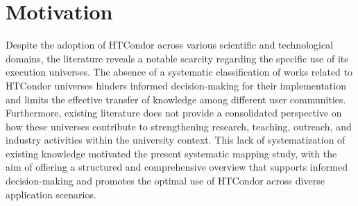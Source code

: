 \label{sec:motivacion}
\section{Motivation}
Despite the adoption of HTCondor across various scientific and technological domains, the literature reveals a notable scarcity regarding the specific use of its execution universes.
The absence of a systematic classification of works related to HTCondor universes hinders informed decision-making for their implementation and limits the effective transfer of knowledge among different user communities. Furthermore, existing literature does not provide a consolidated perspective on how these universes contribute to strengthening research, teaching, outreach, and industry activities within the university context.
This lack of systematization of existing knowledge motivated the present systematic mapping study, with the aim of offering a structured and comprehensive overview that supports informed decision-making and promotes the optimal use of HTCondor across diverse application scenarios.
